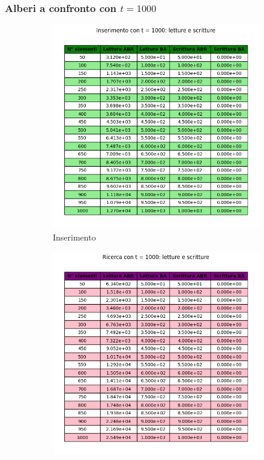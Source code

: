 \subsubsection{Alberi a confronto con $t = 1000$}

\begin{figure}[H]
    \centering
    \begin{subfigure}[b]{0.49\textwidth}
        \centering
        \includegraphics[width=\textwidth]{tables/insert-wr-t1000.png}
        \caption{Inserimento}
        \label{fig:tableinserttimet1000}
    \end{subfigure}
    \hfill
    \begin{subfigure}[b]{0.49\textwidth}
        \centering
        \includegraphics[width=\textwidth]{tables/search-wr-t1000.png}

\end{subfigure}
\end{figure}
